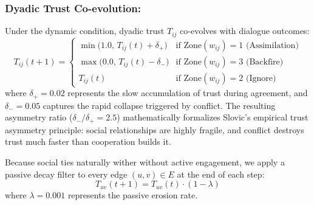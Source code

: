 \subsubsection{Dyadic Trust Co-evolution:}
Under the dynamic condition, dyadic trust $T_{ij}$ co-evolves with dialogue outcomes:
\begin{equation}
    T_{ij}(t+1) = \begin{cases}
        \min\Big(1.0,\, T_{ij}(t) + \delta_+\Big) & \text{if } \text{Zone}(w_{ij}) = 1 \text{ (Assimilation)} \\
        \max\Big(0.0,\, T_{ij}(t) - \delta_-\Big) & \text{if } \text{Zone}(w_{ij}) = 3 \text{ (Backfire)} \\
        T_{ij}(t) & \text{if } \text{Zone}(w_{ij}) = 2 \text{ (Ignore)}
    \end{cases}
\end{equation}
where $\delta_+ = 0.02$ represents the slow accumulation of trust during agreement, and $\delta_- = 0.05$ captures the rapid collapse triggered by conflict. The resulting asymmetry ratio ($\delta_- / \delta_+ = 2.5$) mathematically formalizes Slovic's empirical trust asymmetry principle: social relationships are highly fragile, and conflict destroys trust much faster than cooperation builds it.

Because social ties naturally wither without active engagement, we apply a passive decay filter to every edge $(u, v) \in E$ at the end of each step:
\begin{equation}
    T_{uv}(t+1) = T_{uv}(t) \cdot (1 - \lambda)
\end{equation}
where $\lambda = 0.001$ represents the passive erosion rate.

